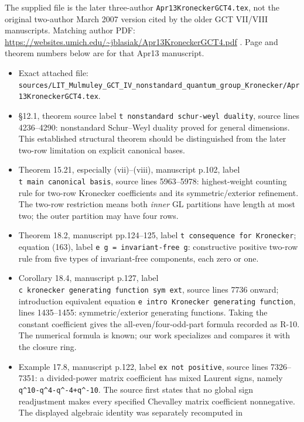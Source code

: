 \documentclass[11pt,a4paper]{article}
\providecommand{\tightlist}{\setlength{\itemsep}{0pt}\setlength{\parskip}{0pt}}
\theoremstyle{definition}\newtheorem{definition}{Definition}
\begin{document}
The supplied file is the later three-author
\texttt{Apr13KroneckerGCT4.tex}, not the original two-author March 2007
version cited by the older GCT VII/VIII manuscripts. Matching author
PDF: \url{https://websites.umich.edu/~jblasiak/Apr13KroneckerGCT4.pdf} .
Page and theorem numbers below are for that Apr13 manuscript.

\begin{itemize}
\tightlist
\item
  Exact attached file:
  \texttt{sources/LIT\_Mulmuley\_GCT\_IV\_nonstandard\_quantum\_group\_Kronecker/Apr13KroneckerGCT4.tex}.
\item
  §12.1, theorem source label
  \texttt{t\ nonstandard\ schur-weyl\ duality}, source lines 4236--4290:
  nonstandard Schur--Weyl duality proved for general dimensions. This
  established structural theorem should be distinguished from the later
  two-row limitation on explicit canonical bases.
\item
  Theorem 15.21, especially (vii)--(viii), manuscript p.102, label
  \texttt{t\ main\ canonical\ basis}, source lines 5963--5978:
  highest-weight counting rule for two-row Kronecker coefficients and
  its symmetric/exterior refinement. The two-row restriction means both
  \emph{inner} GL partitions have length at most two; the outer
  partition may have four rows.
\item
  Theorem 18.2, manuscript pp.124--125, label
  \texttt{t\ consequence\ for\ Kronecker}; equation (163), label
  \texttt{e\ g\ =\ invariant-free\ g}: constructive positive two-row
  rule from five types of invariant-free components, each zero or one.
\item
  Corollary 18.4, manuscript p.127, label
  \texttt{c\ kronecker\ generating\ function\ sym\ ext}, source lines
  7736 onward; introduction equivalent equation
  \texttt{e\ intro\ Kronecker\ generating\ function}, lines 1435--1455:
  symmetric/exterior generating functions. Taking the constant
  coefficient gives the all-even/four-odd-part formula recorded as R-10.
  The numerical formula is known; our work specializes and compares it
  with the closure ring.
\item
  Example 17.8, manuscript p.122, label \texttt{ex\ not\ positive},
  source lines 7326--7351: a divided-power matrix coefficient has mixed
  Laurent signs, namely \texttt{q\^{}10-q\^{}4-q\^{}-4+q\^{}-10}. The
  source first states that no global sign readjustment makes every
  specified Chevalley matrix coefficient nonnegative. The displayed
  algebraic identity was separately recomputed in

\end{itemize}
\end{document}
